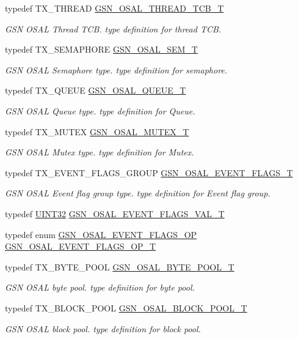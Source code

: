 \begin{DoxyCompactItemize}
typedef TX\_\-THREAD \hyperlink{a00628_ga43c1eefe78fa26e478301976f96ac31f}{GSN\_\-OSAL\_\-THREAD\_\-TCB\_\-T}
\begin{DoxyCompactList}\small\item\em GSN OSAL Thread TCB. type definition for thread TCB. \end{DoxyCompactList}\item 
typedef TX\_\-SEMAPHORE \hyperlink{a00628_gab4b3554407ce22b940e2fcd3faf5fd47}{GSN\_\-OSAL\_\-SEM\_\-T}
\begin{DoxyCompactList}\small\item\em GSN OSAL Semaphore type. type definition for semaphore. \end{DoxyCompactList}\item 
typedef TX\_\-QUEUE \hyperlink{a00628_gaebe1c924d01bf6607bd65961bf134095}{GSN\_\-OSAL\_\-QUEUE\_\-T}
\begin{DoxyCompactList}\small\item\em GSN OSAL Queue type. type definition for Queue. \end{DoxyCompactList}\item 
typedef TX\_\-MUTEX \hyperlink{a00628_gae997291afc7166c897f459023e0154ad}{GSN\_\-OSAL\_\-MUTEX\_\-T}
\begin{DoxyCompactList}\small\item\em GSN OSAL Mutex type. type definition for Mutex. \end{DoxyCompactList}\item 
typedef TX\_\-EVENT\_\-FLAGS\_\-GROUP \hyperlink{a00628_gab93fdfc637101a29260ca105d3eb924e}{GSN\_\-OSAL\_\-EVENT\_\-FLAGS\_\-T}
\begin{DoxyCompactList}\small\item\em GSN OSAL Event flag group type. type definition for Event flag group. \end{DoxyCompactList}\item 
typedef \hyperlink{a00660_gae1e6edbbc26d6fbc71a90190d0266018}{UINT32} \hyperlink{a00536_afb39f905ce07232becc42deeccb9ad4c}{GSN\_\-OSAL\_\-EVENT\_\-FLAGS\_\-VAL\_\-T}
\item 
typedef enum \hyperlink{a00536_ab43ce60f761c421854ded68117c8f8f2}{GSN\_\-OSAL\_\-EVENT\_\-FLAGS\_\-OP} \hyperlink{a00536_a3782687de549490574b44f3374fb5731}{GSN\_\-OSAL\_\-EVENT\_\-FLAGS\_\-OP\_\-T}
\item 
typedef TX\_\-BYTE\_\-POOL \hyperlink{a00628_gaf2af06408f9cf286dc400b5957264f00}{GSN\_\-OSAL\_\-BYTE\_\-POOL\_\-T}
\begin{DoxyCompactList}\small\item\em GSN OSAL byte pool. type definition for byte pool. \end{DoxyCompactList}\item 
typedef TX\_\-BLOCK\_\-POOL \hyperlink{a00628_ga6adbb87a82d8b5936dd6f535024d81b7}{GSN\_\-OSAL\_\-BLOCK\_\-POOL\_\-T}
\begin{DoxyCompactList}\small\item\em GSN OSAL block pool. type definition for block pool. \end{DoxyCompactList}\end{DoxyCompactItemize}
